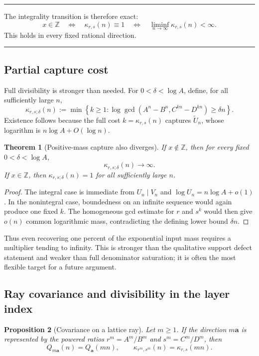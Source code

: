\documentclass[11pt,oneside]{article}
\newtheorem{theorem}{Theorem}[section]
\newtheorem{proposition}[theorem]{Proposition}
\theoremstyle{definition}
\theoremstyle{remark}
\newcommand{\Z}{\mathbb Z}
\newenvironment{resultbox}
{\begin{center}\begin{minipage}{0.94\textwidth}\hrule\vspace{0.5em}}
{\vspace{0.45em}\hrule\end{minipage}\end{center}}
\begin{document}
\begin{resultbox}
The integrality transition is therefore exact:
\[
 x\in\Z\quad\Longleftrightarrow\quad
 \kappa_{r,s}(n)\equiv1
 \quad\Longleftrightarrow\quad
 \liminf_{n\to\infty}\kappa_{r,s}(n)<\infty.
\]
This holds in every fixed rational direction.
\end{resultbox}

\subsection{Partial capture cost}

Full divisibility is stronger than needed.  For $0<\delta<\log A$, define, for all
sufficiently large $n$,
\[
 \kappa_{r,s;\delta}(n)
 :=\min\left\{k\ge1:
 \log\gcd(A^n-B^n,C^{kn}-D^{kn})\ge\delta n\right\}.
\]
Existence follows because the full cost $k=\kappa_{r,s}(n)$ captures
$\widetilde U_n$, whose logarithm is $n\log A+O(\log n)$.

\begin{theorem}[Positive-mass capture also diverges]
\label{thm:partial-capture}
If $x\notin\Z$, then for every fixed $0<\delta<\log A$,
\[
 \kappa_{r,s;\delta}(n)\longrightarrow\infty.
\]
If $x\in\Z$, then $\kappa_{r,s;\delta}(n)=1$ for all sufficiently large $n$.
\end{theorem}

\begin{proof}
The integral case is immediate from $U_n\mid V_n$ and
$\log U_n=n\log A+o(1)$.  In the nonintegral case, boundedness on an infinite sequence would
again produce one fixed $k$.  The homogeneous gcd estimate for $r$ and $s^k$ would then give
$o(n)$ common logarithmic mass, contradicting the defining lower bound $\delta n$.
\end{proof}

Thus even recovering one percent of the exponential input mass requires a multiplier tending
to infinity.  This is stronger than the qualitative support defect statement and weaker than
full denominator saturation; it is often the most flexible target for a future argument.

\subsection{Ray covariance and divisibility in the layer index}

\begin{proposition}[Covariance on a lattice ray]
\label{prop:ray-covariance}
Let $m\ge1$.  If the direction $m\mathbf a$ is represented by the powered ratios
$r^m=A^m/B^m$ and $s^m=C^m/D^m$, then
\[
 Q_{m\mathbf a}(n)=Q_{\mathbf a}(mn),
 \qquad
 \kappa_{r^m,s^m}(n)=\kappa_{r,s}(mn).
\]
\end{proposition}
\end{document}
